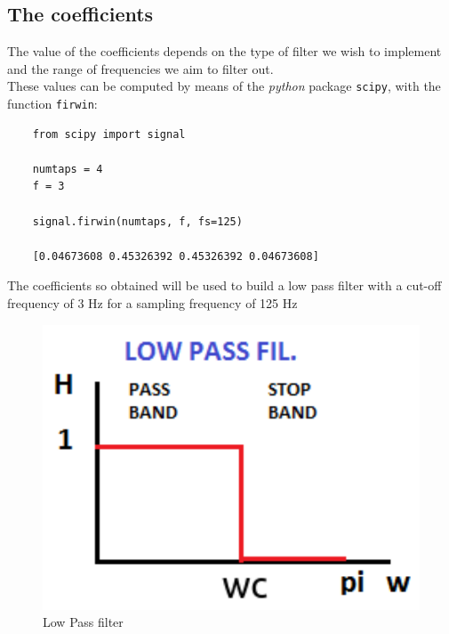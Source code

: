 \documentclass[11pt,a4paper,twocolumn]{IEEEtran}
\begin{document}
	\subsection*{The coefficients}
	The value of the coefficients depends on the type of filter we wish to implement and the range of frequencies we aim to filter out.\\
	These values can be computed by means of the \emph{python} package \texttt{scipy}, with the function \texttt{firwin}:
	\begin{lstlisting}
	from scipy import signal
	
	numtaps = 4
	f = 3
	
	signal.firwin(numtaps, f, fs=125)
	
	[0.04673608 0.45326392 0.45326392 0.04673608]
	\end{lstlisting}
	The coefficients so obtained will be used to build a low pass filter with a cut-off frequency of 3 Hz for a sampling frequency of 125 Hz
	\begin{figure}[h]
		\centering
		\includegraphics[width=0.7\linewidth]{img/lowpass}
		\caption{Low Pass filter}
	\end{figure}
\end{document}
